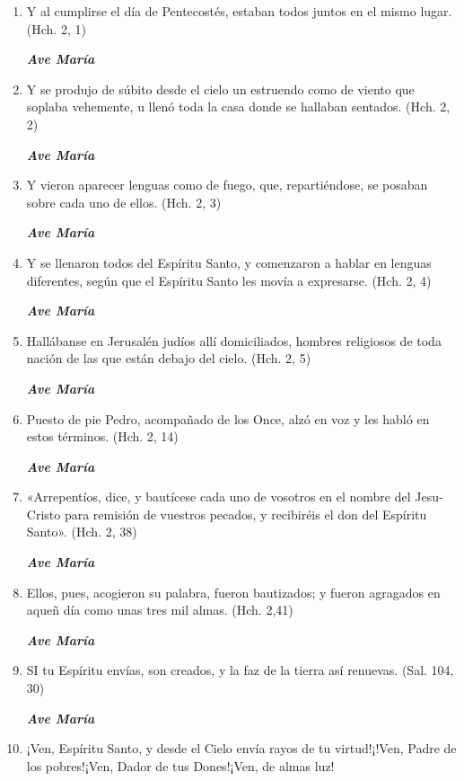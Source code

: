 \documentclass[a4paper,11pt, oneside]{report}
\begin{document}
      \begin{enumerate}

        \item Y al cumplirse el día de Pentecostés, estaban todos juntos en el mismo lugar. (Hch. 2, 1)

        \textbf{\textit{Ave María}}

        \item Y se produjo de súbito desde el cielo un estruendo como de viento que soplaba vehemente, u llenó toda la casa
        donde se hallaban sentados. (Hch. 2, 2)

        \textbf{\textit{Ave María}}

        \item Y vieron aparecer lenguas como de fuego, que, repartiéndose, se posaban sobre cada uno de ellos. (Hch. 2, 3)

        \textbf{\textit{Ave María}}

        \item Y se llenaron todos del Espíritu Santo, y comenzaron a hablar en lenguas diferentes, según que el Espíritu Santo les movía
        a expresarse. (Hch. 2, 4)

        \textbf{\textit{Ave María}}

        \item Hallábanse en Jerusalén judíos allí domiciliados, hombres religiosos de toda nación de las que están debajo del cielo. (Hch. 2, 5)

        \textbf{\textit{Ave María}}

        \item Puesto de pie Pedro, acompañado de los Once, alzó en voz y les habló en estos términos. (Hch. 2, 14)

        \textbf{\textit{Ave María}}

        \item «Arrepentíos, dice, y bautícese cada uno de vosotros en el nombre del Jesu-Cristo para remisión de vuestros pecados, y recibiréis el don
        del Espíritu Santo». (Hch. 2, 38)

        \textbf{\textit{Ave María}}

        \item Ellos, pues, acogieron su palabra, fueron bautizados; y fueron agragados en aqueñ día como unas tres mil almas. (Hch. 2,41)

        \textbf{\textit{Ave María}}

        \item SI tu Espíritu envías, son creados, y la faz de la tierra así renuevas. (Sal. 104, 30)

        \textbf{\textit{Ave María}}

        \item ¡Ven, Espíritu Santo, y desde el Cielo envía rayos de tu virtud!¡!Ven, Padre de los pobres!¡Ven, Dador de tus Dones!¡Ven, de almas luz!
        
      \end{enumerate}
\end{document}
